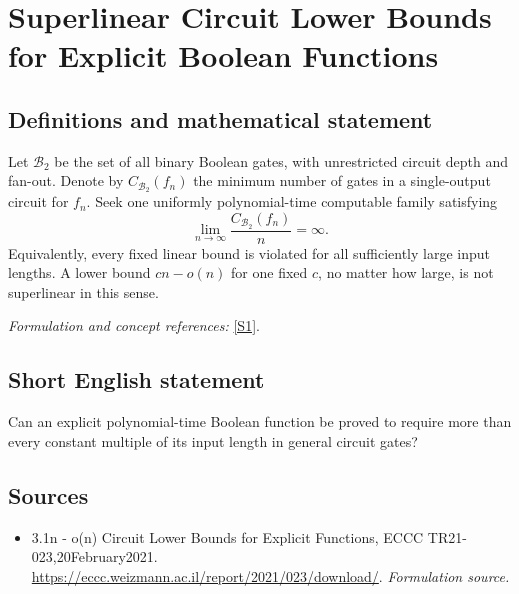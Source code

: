 \documentclass[11pt]{article}
\begin{document}
\section*{\texorpdfstring{Superlinear Circuit Lower Bounds for Explicit Boolean Functions}{Superlinear Circuit Lower Bounds for Explicit Boolean Functions}}\label{30006747}
\subsection{Definitions and mathematical statement}
Let $\mathcal B_2$ be the set of all binary Boolean gates, with unrestricted circuit depth and fan-out. Denote by $C_{\mathcal B_2}(f_n)$ the minimum number of gates in a single-output circuit for $f_n$. Seek one uniformly polynomial-time computable family satisfying
\[
 \lim_{n\to\infty}\frac{C_{\mathcal B_2}(f_n)}{n}=\infty.
\]
Equivalently, every fixed linear bound is violated for all sufficiently large input lengths. A lower bound $cn-o(n)$ for one fixed $c$, no matter how large, is not superlinear in this sense.
\par\smallskip\textit{Formulation and concept references:} \href{https://eccc.weizmann.ac.il/report/2021/023/download/}{[S1]}.

\subsection{Short English statement}
Can an explicit polynomial-time Boolean function be proved to require more than every constant multiple of its input length in general circuit gates?
\subsection{Sources}
\begin{itemize}
\item[S1]3.1n - o(n) Circuit Lower Bounds for Explicit Functions, ECCC TR21-023,20February2021.
\url{https://eccc.weizmann.ac.il/report/2021/023/download/}.
\textit{Formulation source.}
\end{itemize}
\end{document}
